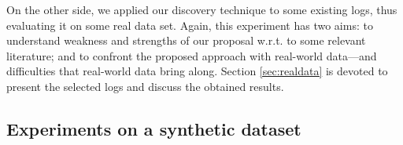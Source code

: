 On the other side, we applied our discovery technique to some existing logs, thus evaluating it on some real data set. Again, this experiment has two aims: to understand weakness and strengths of our proposal w.r.t. to some relevant literature; and to confront the proposed approach with real-world data---and difficulties that real-world data bring along. Section \ref{sec:realdata} is devoted to present the selected logs and discuss the obtained results.




\subsection{Experiments on a synthetic dataset}
\label{sec:syntheticlog}

%


